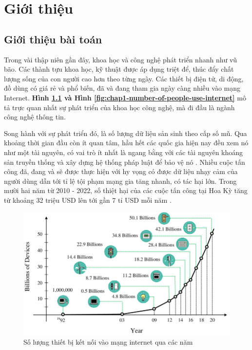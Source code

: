 \chapter{Giới thiệu}
\label{chapter1}
\section{Giới thiệu bài toán}

Trong vài thập niên gần đây, khoa học và công nghệ phát triển nhanh như vũ bão. Các thành tựu khoa học, kỹ thuật được áp dụng triệt để, thúc đẩy chất lượng sống của con người cao hơn theo từng ngày. Các thiết bị điện tử, di động, đồ dùng có giá rẻ và phổ biến, đã và đang tham gia ngày càng nhiều vào mạng Internet. \textbf{Hình \ref{fig:chap1-number-of-connected-device-to-internet} và Hình \ref{fig:chap1-number-of-people-use-internet}} mô tả trực quan nhất sự phát triển của khoa học công nghệ, mà đi đầu là ngành công nghệ thông tin.

Song hành với sự phát triển đó, là số lượng dữ liệu sản sinh theo cấp số mũ. Qua khoảng thời gian đầu còn ít quan tâm, hầu hết các quốc gia hiện nay đều xem nó như một tài nguyên, có vai trò ít nhất là ngang bằng với các tài nguyên khoáng sản truyền thống và xây dựng hệ thống pháp luật để bảo vệ nó \cite{bygrave2010privacy}. Nhiều cuộc tấn công đã, đang và sẽ được thực hiện với hy vọng có được dữ liệu nhạy cảm của người dùng \cite{holt2016exploring} dẫn tới tỉ lệ tội phạm mạng gia tăng nhanh, có tác hại lớn. Trong mười hai năm từ 2010 - 2022, số thiệt hại của các cuộc tấn công tại Hoa Kỳ tăng từ khoảng 32 triệu USD lên tới gần 7 tỉ USD mỗi năm \cite{sharif2022literature}.


\begin{figure}
    \centering
    \includegraphics[scale=0.5]{graphics/chapter-1/chap1-number-of-connected-device-to-internet.png}
    \caption{Số lượng thiết bị kết nối vào mạng internet qua các năm \cite{ali2015next}}
    \label{fig:chap1-number-of-connected-device-to-internet}
\end{figure}

